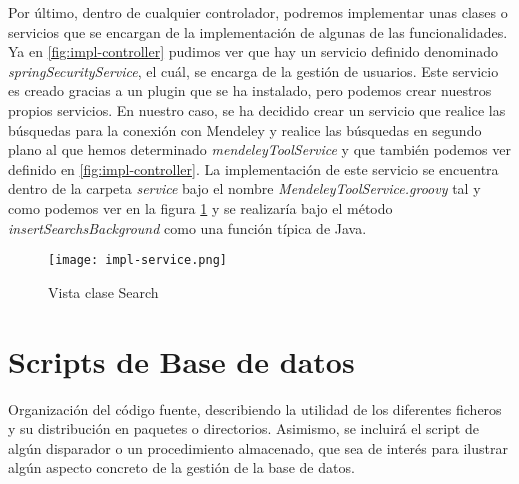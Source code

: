 Por último, dentro de cualquier controlador, podremos implementar unas clases o servicios que se encargan de la implementación de algunas de las funcionalidades. Ya en \ref{fig:impl-controller} pudimos ver que hay un servicio definido denominado \textit{springSecurityService}, el cuál, se encarga de la gestión de usuarios. Este servicio es creado gracias a un plugin que se ha instalado, pero podemos crear nuestros propios servicios. En nuestro caso, se ha decidido crear un servicio que realice las búsquedas para la conexión con Mendeley y realice las búsquedas en segundo plano al que hemos determinado \textit{mendeleyToolService} y que también podemos ver definido en \ref{fig:impl-controller}. La implementación de este servicio se encuentra dentro de la carpeta \textit{service} bajo el nombre \textit{MendeleyToolService.groovy} tal y como podemos ver en la figura \ref{fig:impl-service} y se realizaría bajo el método \textit{insertSearchsBackground} como una función típica de Java.

\begin{figure}[!hpt]
	\begin{center} 
		\texttt{[image: impl-service.png]}
		\caption{Vista clase Search}
		\label{fig:impl-service}
	\end{center}
\end{figure}

\section{Scripts de Base de datos}
Organización del código fuente, describiendo la utilidad de los diferentes ficheros y su distribución en paquetes o directorios. Asimismo, se incluirá el script de algún disparador o un procedimiento almacenado, que sea de interés para ilustrar algún aspecto concreto de la gestión de la base de datos.
